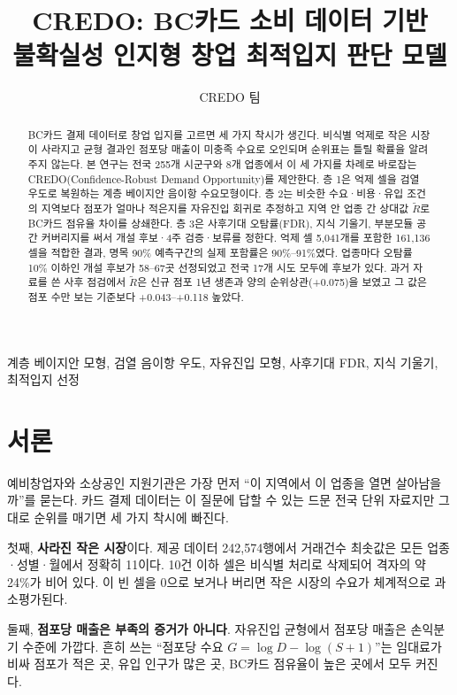 \documentclass[journal,a4paper]{IEEEtran}
\title{CREDO: BC카드 소비 데이터 기반\\불확실성 인지형 창업 최적입지 판단 모델}
\author{CREDO 팀}
\begin{document}
\maketitle

\begin{abstract}
BC카드 결제 데이터로 창업 입지를 고르면 세 가지 착시가 생긴다. 비식별 억제로 작은 시장이 사라지고 균형 결과인 점포당 매출이 미충족 수요로 오인되며 순위표는 틀릴 확률을 알려주지 않는다. 본 연구는 전국 255개 시군구와 8개 업종에서 이 세 가지를 차례로 바로잡는 CREDO(Confidence-Robust Demand Opportunity)를 제안한다. 층 1은 억제 셀을 검열 우도로 복원하는 계층 베이지안 음이항 수요모형이다. 층 2는 비슷한 수요·비용·유입 조건의 지역보다 점포가 얼마나 적은지를 자유진입 회귀로 추정하고 지역 안 업종 간 상대값 $\tilde R$로 BC카드 점유율 차이를 상쇄한다. 층 3은 사후기대 오탐률(FDR), 지식 기울기, 부분모듈 공간 커버리지를 써서 개설 후보·4주 검증·보류를 정한다. 억제 셀 5,041개를 포함한 161,136셀을 적합한 결과, 명목 90\% 예측구간의 실제 포함률은 90\%--91\%였다. 업종마다 오탐률 10\% 이하인 개설 후보가 58--67곳 선정되었고 전국 17개 시도 모두에 후보가 있다. 과거 자료를 쓴 사후 점검에서 $\tilde R$은 신규 점포 1년 생존과 양의 순위상관(+0.075)을 보였고 그 값은 점포 수만 보는 기준보다 +0.043--+0.118 높았다.
\end{abstract}

\begin{IEEEkeywords}
계층 베이지안 모형, 검열 음이항 우도, 자유진입 모형, 사후기대 FDR, 지식 기울기, 최적입지 선정
\end{IEEEkeywords}

\section{서론}
예비창업자와 소상공인 지원기관은 가장 먼저 ``이 지역에서 이 업종을 열면 살아남을까''를 묻는다. 카드 결제 데이터는 이 질문에 답할 수 있는 드문 전국 단위 자료지만 그대로 순위를 매기면 세 가지 착시에 빠진다.

첫째, \textbf{사라진 작은 시장}이다. 제공 데이터 242,574행에서 거래건수 최솟값은 모든 업종·성별·월에서 정확히 11이다. 10건 이하 셀은 비식별 처리로 삭제되어 격자의 약 24\%가 비어 있다. 이 빈 셀을 0으로 보거나 버리면 작은 시장의 수요가 체계적으로 과소평가된다.

둘째, \textbf{점포당 매출은 부족의 증거가 아니다}. 자유진입 균형에서 점포당 매출은 손익분기 수준에 가깝다\cite{BerryWaldfogel1999}. 흔히 쓰는 ``점포당 수요 $G=\log D-\log(S+1)$''는 임대료가 비싸 점포가 적은 곳, 유입 인구가 많은 곳, BC카드 점유율이 높은 곳에서 모두 커진다.
\end{document}
